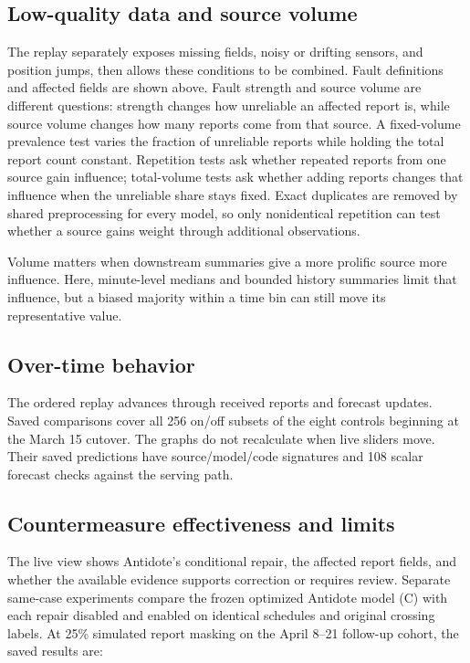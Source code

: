 \documentclass[11pt]{article}
\begin{document}
\subsection{Low-quality data and source volume}
The replay separately exposes missing fields, noisy or drifting sensors, and position jumps, then allows these conditions to be combined. Fault definitions and affected fields are shown above. Fault strength and source volume are different questions: strength changes how unreliable an affected report is, while source volume changes how many reports come from that source. A fixed-volume prevalence test varies the fraction of unreliable reports while holding the total report count constant. Repetition tests ask whether repeated reports from one source gain influence; total-volume tests ask whether adding reports changes that influence when the unreliable share stays fixed. Exact duplicates are removed by shared preprocessing for every model, so only nonidentical repetition can test whether a source gains weight through additional observations.

Volume matters when downstream summaries give a more prolific source more influence. Here, minute-level medians and bounded history summaries limit that influence, but a biased majority within a time bin can still move its representative value.

\subsection{Over-time behavior}
The ordered replay advances through received reports and forecast updates. Saved comparisons cover all 256 on/off subsets of the eight controls beginning at the March 15 cutover. The graphs do not recalculate when live sliders move. Their saved predictions have source/model/code signatures and 108 scalar forecast checks against the serving path.

\subsection{Countermeasure effectiveness and limits}
The live view shows Antidote's conditional repair, the affected report fields, and whether the available evidence supports correction or requires review. Separate same-case experiments compare the frozen optimized Antidote model (C) with each repair disabled and enabled on identical schedules and original crossing labels. At 25\% simulated report masking on the April 8--21 follow-up cohort, the saved results are:
\end{document}
